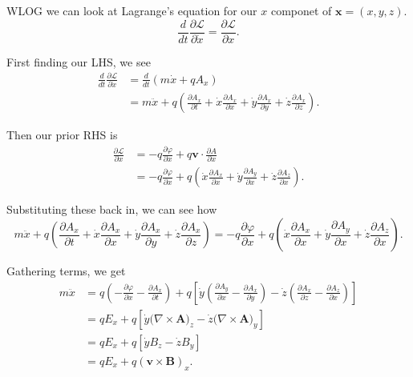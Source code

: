 \documentclass[12pt]{revtex4-2}
\begin{document}
WLOG we can look at Lagrange's equation for our $x$ componet of $\mathbf{x}=(x,y,z)$.
\begin{equation}
    \frac{d}{dt}\frac{\partial\mathcal{L}}{\partial \dot{x}} = \frac{\partial \mathcal{L}}{\partial x}.
\end{equation}

First finding our LHS, we see 
\begin{align}
    \frac{d}{dt}\frac{\partial\mathcal{L}}{\partial\dot{x}} &= \frac{d}{dt}\left( m\dot{x} + qA_x \right) \\
    &= m\ddot{x} + q\left( \frac{\partial A_x}{\partial t} + \dot{x}\frac{\partial A_x}{\partial x} + \dot{y}\frac{\partial A_x}{\partial y} + \dot{z}\frac{\partial A_x}{\partial z} \right).
\end{align}

Then our prior RHS is 
\begin{align}
    \frac{\partial\mathcal{L}}{\partial x} &= -q\frac{\partial\varphi}{\partial x} + q\mathbf{v} \cdot \frac{\partial A}{\partial x} \\
    &= -q\frac{\partial\varphi}{\partial x} + q\left( \dot{x}\frac{\partial A_x}{\partial x} + \dot{y}\frac{\partial A_y}{\partial x} + \dot{z}\frac{\partial A_z}{\partial x} \right).
\end{align}

Substituting these back in, we can see how 
\begin{equation}
    m\ddot{x} + q\left( \frac{\partial A_x}{\partial t} + \dot{x}\frac{\partial A_x}{\partial x} + \dot{y}\frac{\partial A_x}{\partial y} + \dot{z}\frac{\partial A_x}{\partial z} \right) = -q\frac{\partial\varphi}{\partial x} + q\left( \dot{x}\frac{\partial A_x}{\partial x} + \dot{y}\frac{\partial A_y}{\partial x} + \dot{z}\frac{\partial A_z}{\partial x} \right).
\end{equation}

Gathering terms, we get 
\begin{align}
    m\ddot{x} &= q\left(-\frac{\partial\varphi}{\partial x} - \frac{\partial A_x}{\partial t}\right) + q\left[ \dot{y}\left( \frac{\partial A_y}{\partial x} - \frac{\partial A_x}{\partial y} \right) - \dot{z}\left( \frac{\partial A_x}{\partial z} - \frac{\partial A_z}{\partial x} \right) \right] \\
    &= q E_x + q\left[ \dot{y}\big(\nabla\times\mathbf{A}\big)_z - \dot{z}\big( \nabla\times\mathbf{A} \big)_y \right] \\
    &= q E_x + q\left[ \dot{y}B_z - \dot{z}B_y \right] \\
    &= q E_x + q\left( \mathbf{v} \times \mathbf{B} \right)_x.
\end{align}
\end{document}

